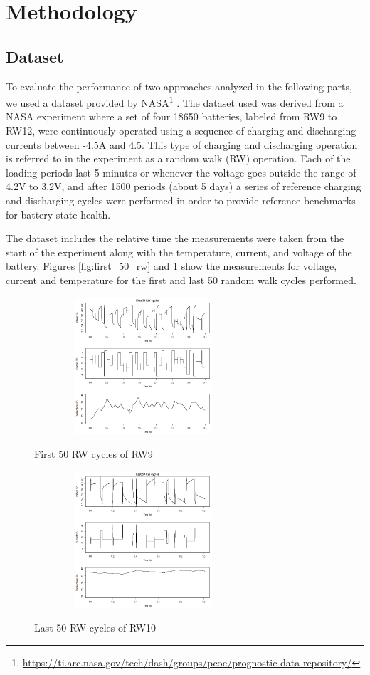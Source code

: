 \section{Methodology}

\subsection{Dataset}

To evaluate the performance of two approaches analyzed in the following parts, we used a dataset provided by NASA\footnote{\url{https://ti.arc.nasa.gov/tech/dash/groups/pcoe/prognostic-data-repository/}} \cite{bole2014adaptation}. The dataset used was derived from a NASA experiment where a set of four 18650 \lib batteries, labeled from RW9 to RW12, were continuously operated using a sequence of charging and discharging currents between -4.5A and 4.5. This type of charging and discharging operation is referred to in the experiment as a random walk (RW) operation. Each of the loading periods last 5 minutes or whenever the voltage goes outside the range of 4.2V to 3.2V, and after 1500 periods (about 5 days) a series of reference charging and discharging cycles were performed in order to provide reference benchmarks for battery state health.

The dataset includes the relative time the measurements were taken from the start of the experiment along with the temperature, current, and voltage of the battery. Figures \ref{fig:first_50_rw} and \ref{fig:last_50_rw} show the measurements for voltage, current and temperature for the first and last 50 random walk cycles performed.

\begin{figure}
\begin{multicols}{2}
	\includegraphics[height=2in, width=3.2in]{figures/GPR/first_50_rw}
	\caption{First 50 RW cycles of RW9}
	\label{fig:first_50_rw}
	\includegraphics[height=2in, width=3.2in]{figures/GPR/last_50_rw}
	\caption{Last 50 RW cycles of RW10}
	\label{fig:last_50_rw}
\end{multicols}
\end{figure}

